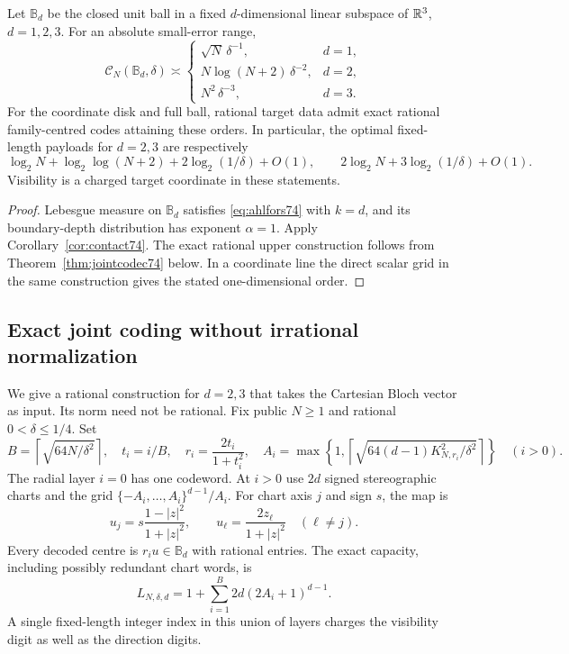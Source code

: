 \begin{corollary}\label{cor:jointball74}
Let $\mathbb B_d$ be the closed unit ball in a fixed $d$-dimensional
linear subspace of $\mathbb R^3$, $d=1,2,3$. For an absolute small-error range,
\begin{equation}\label{eq:jointball74}
 \mathcal C_N(\mathbb B_d,\delta)\asymp
 \begin{cases}
 \sqrt N\,\delta^{-1},&d=1,\\
 N\log(N+2)\,\delta^{-2},&d=2,\\
 N^2\,\delta^{-3},&d=3.
 \end{cases}
\end{equation}
For the coordinate disk and full ball, rational target data admit exact
rational family-centred codes attaining these orders. In particular,
the optimal fixed-length payloads for $d=2,3$ are respectively
\[
 \log_2N+\log_2\log(N+2)+2\log_2(1/\delta)+O(1),
 \qquad 2\log_2N+3\log_2(1/\delta)+O(1).
\]
Visibility is a charged target coordinate in these statements.
\end{corollary}
\begin{proof}
Lebesgue measure on $\mathbb B_d$ satisfies \eqref{eq:ahlfors74} with
$k=d$, and its boundary-depth distribution has exponent $\alpha=1$.
Apply Corollary~\ref{cor:contact74}. The exact rational upper
construction follows from Theorem~\ref{thm:jointcodec74} below. In a
coordinate line the direct scalar grid in the same construction gives
the stated one-dimensional order.
\end{proof}

\subsection{Exact joint coding without irrational normalization}
We give a rational construction for $d=2,3$ that takes the Cartesian
Bloch vector as input. Its norm need not be rational. Fix public
$N\ge1$ and rational $0<\delta\le1/4$. Set
\begin{equation}\label{eq:jointgrids74}
 B=\left\lceil\sqrt{64N/\delta^2}\right\rceil,\quad
 t_i=i/B,\quad r_i=\frac{2t_i}{1+t_i^2},\quad
 A_i=\max\left\{1,\left\lceil\sqrt{64(d-1)K_{N,r_i}^2/\delta^2}
                                      \right\rceil\right\}\quad(i>0).
\end{equation}
The radial layer $i=0$ has one codeword. At $i>0$ use $2d$ signed
stereographic charts and the grid $\{-A_i,\ldots,A_i\}^{d-1}/A_i$.
For chart axis $j$ and sign $s$, the map is
\begin{equation}\label{eq:spherechart74}
 u_j=s\frac{1-|z|^2}{1+|z|^2},\qquad
 u_\ell=\frac{2z_\ell}{1+|z|^2}\quad(\ell\ne j).
\end{equation}
Every decoded centre is $r_i u\in\mathbb B_d$ with rational entries.
The exact capacity, including possibly redundant chart words, is
\begin{equation}\label{eq:jointcapacity74}
 L_{N,\delta,d}=1+\sum_{i=1}^{B}2d(2A_i+1)^{d-1}.
\end{equation}
A single fixed-length integer index in this union of layers charges
the visibility digit as well as the direction digits.

